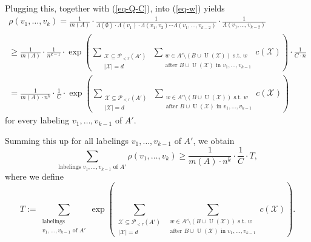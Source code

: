 \documentclass[11pt]{article}
\theoremstyle{definition}
\numberwithin{equation}{section}
\begin{document}
Plugging this, together with (\ref{eq-Q-C}), into (\ref{eq-w}) yields
\begin{multline*}
\rho(v_1,\dots,v_k)=\frac{1}{m(A)}\cdot \frac{1}{\Lambda(\emptyset)\cdot \Lambda(v_1)\cdot \Lambda(v_1, v_2)\dotsm \Lambda(v_1,\dots,v_{k-2})}\cdot \frac{1}{\Lambda(v_1,\dots,v_{k-2})}\\
\geq \frac{1}{m(A)}\cdot \frac{1}{n^{k-1}}\cdot \exp\left(\sum_{\substack{\mathcal{X}\subseteq \mathcal{P}\!_{<r}(A')\\\vert \mathcal{X}\vert=d}}\ \sum_{\substack{w\in A'\setminus(B\cup \operatorname{U}(\mathcal{X}))\text{ s.t. }w\\\text{after }B\cup \operatorname{U}(\mathcal{X})\text{ in }v_1,\dots,v_{k-1}}}c(\mathcal{X})\right)\cdot \frac{1}{C\cdot n}\\
=\frac{1}{m(A)\cdot n^k}\cdot \frac{1}{C}\cdot \exp\left(\sum_{\substack{\mathcal{X}\subseteq \mathcal{P}\!_{<r}(A')\\\vert \mathcal{X}\vert=d}}\ \sum_{\substack{w\in A'\setminus(B\cup \operatorname{U}(\mathcal{X}))\text{ s.t. }w\\\text{after }B\cup \operatorname{U}(\mathcal{X})\text{ in }v_1,\dots,v_{k-1}}}c(\mathcal{X})\right)
\end{multline*}
for every labeling $v_1,\dots,v_{k-1}$ of $A'$.

Summing this up for all labelings $v_1,\dots,v_{k-1}$ of $A'$, we obtain
\begin{equation}\label{ineq1}
\sum_{\text{labelings }v_1,\dots, v_{k-1}\text{ of } A'}\rho(v_1,\dots,v_k)
\geq \frac{1}{m(A)\cdot n^k}\cdot \frac{1}{C}\cdot T,
\end{equation}
where we define
\[T:=\sum_{\substack{\text{labelings }\\v_1,\dots, v_{k-1}\text{ of } A'}}\exp\left(\sum_{\substack{\mathcal{X}\subseteq \mathcal{P}\!_{<r}(A')\\\vert \mathcal{X}\vert=d}}\ \sum_{\substack{w\in A'\setminus(B\cup \operatorname{U}(\mathcal{X}))\text{ s.t. }w\\\text{after }B\cup \operatorname{U}(\mathcal{X})\text{ in }v_1,\dots,v_{k-1}}}c(\mathcal{X})\right).\]
\end{document}
